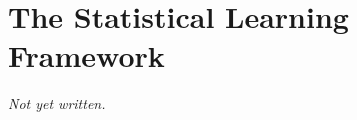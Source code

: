 \chapter{The Statistical Learning Framework}\label{ch:learning-framework}


\textit{Not yet written.}
